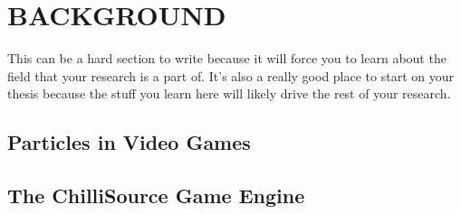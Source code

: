 
\chapter{BACKGROUND}\label{ch:background}

This can be a hard section to write because it will force you to learn about the field that your research is a part of.
It's also a really good place to start on your thesis because the stuff you learn here will likely drive the rest of your research.

\section{Particles in Video Games}


\section{The ChilliSource Game Engine}


